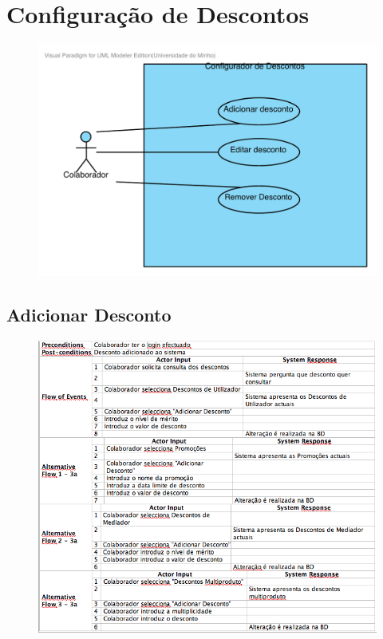 \section{Configuração de Descontos}
\begin{figure}[!htb]
	\centering
	\includegraphics[scale=0.7]{images/Prints/ConfiguracaoDescontos/ConfiguracaoDescontos.pdf}
\end{figure}

\pagebreak

\subsection{Adicionar Desconto}
\begin{figure}[!htb]
	\centering
	\includegraphics[scale=0.61]{images/Prints/ConfiguracaoDescontos/AdicionarDesconto.png}
\end{figure}

